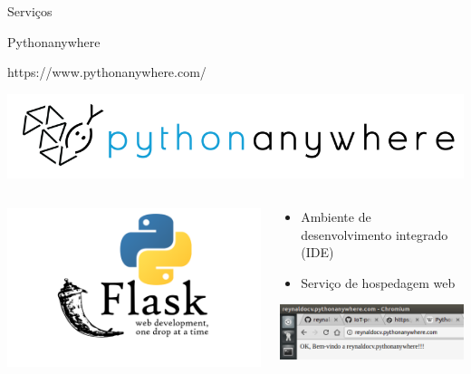 \documentclass{beamer}
\begin{document}
\begin{frame}{Serviços}

\begin{exampleblock}{}
   \begin{center}
   Pythonanywhere
   \end{center}
\end{exampleblock}
https://www.pythonanywhere.com/
\begin{center}
\includegraphics[width=1\textwidth]{img/pythonanywhere.png}  
\end{center}
\begin{columns}
\begin{column}{0.4\textwidth}
\begin{center}
\includegraphics[width=1\textwidth]{img/pythonanywhere_flask.png}   
\end{center}
\end{column}
\begin{column}{0.6\textwidth}
\begin{itemize}\tiny
 \item Ambiente de desenvolvimento integrado (IDE)
 \item Serviço de hospedagem web  
\end{itemize}
\begin{center}
\includegraphics[width=.6\textwidth]{img/pythonanywhere_rey.png}    
\end{center}
\end{column}
\end{columns}
\end{frame}
\end{document}
